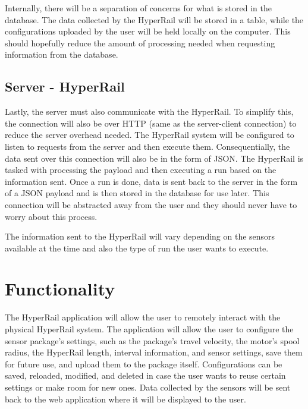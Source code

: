\documentclass[onecolumn, draftclsnofoot,10pt, compsoc]{IEEEtran}
\begin{document}
        Internally, there will be a separation of concerns for what is stored in the database. The data collected by the HyperRail will be stored in a table, while the configurations uploaded by the user will be held locally on the computer. This should hopefully reduce the amount of processing needed when requesting information from the database.
    
    \subsection{Server - HyperRail}
    
        Lastly, the server must also communicate with the HyperRail. To simplify this, the connection will also be over HTTP (same as the server-client connection) to reduce the server overhead needed. The HyperRail system will be configured to listen to requests from the server and then execute them. Consequentially, the data sent over this connection will also be in the form of JSON. The HyperRail is tasked with processing the payload and then executing a run based on the information sent. Once a run is done, data is sent back to the server in the form of a JSON payload and is then stored in the database for use later. This connection will be abstracted away from the user and they should never have to worry about this process.
        
        The information sent to the HyperRail will vary depending on the sensors available at the time and also the type of run the user wants to execute. 
        
\section{Functionality}
The HyperRail application will allow the user to remotely interact with the physical HyperRail system. The application will allow the user to configure the sensor package's settings, such as the package's travel velocity, the motor's spool radius, the HyperRail length, interval information, and sensor settings, save them for future use, and upload them to the package itself. Configurations can be saved, reloaded, modified, and deleted in case the user wants to reuse certain settings or make room for new ones. Data collected by the sensors will be sent back to the web application where it will be displayed to the user.
\end{document}
